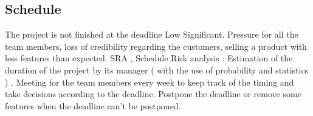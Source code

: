 

\subsection{Schedule}
{The project is not finished at the deadline}
{Low}
{Significant. Pressure for all the team members, loss of credibility regarding the customers, selling a product with less features than expected.}
{ SRA , Schedule Risk analysis : Estimation of the duration of the project by its manager ( with the use of probability and statistics ) . Meeting for the team members every week to keep track of the timing and take decisions according to the deadline. }
{ Postpone the deadline or remove some features when the deadline can't be postponed. }